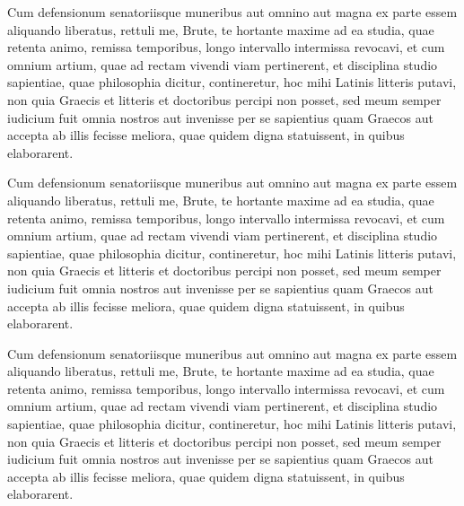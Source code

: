 \documentclass{article}
\begin{document}
\pstart%
Cum defensionum  senatoriisque muneribus aut omnino aut magna ex parte essem aliquando liberatus, rettuli me, Brute, te hortante maxime ad ea studia, quae retenta animo, remissa temporibus, longo intervallo intermissa revocavi, et cum omnium artium, quae ad rectam vivendi viam pertinerent,  et disciplina studio sapientiae, quae philosophia dicitur, contineretur, hoc mihi Latinis litteris  putavi, non quia  Graecis et litteris et doctoribus percipi non posset, sed meum semper iudicium fuit omnia nostros aut invenisse per se sapientius quam Graecos aut accepta ab illis fecisse meliora, quae quidem digna statuissent, in quibus elaborarent.
\pend

\pstart%
Cum defensionum  senatoriisque muneribus aut omnino aut magna ex parte essem aliquando liberatus, rettuli me, Brute, te hortante maxime ad ea studia, quae retenta animo, remissa temporibus, longo intervallo intermissa revocavi, et cum omnium artium, quae ad rectam vivendi viam pertinerent,  et disciplina studio sapientiae, quae philosophia dicitur, contineretur, hoc mihi Latinis litteris  putavi, non quia  Graecis et litteris et doctoribus percipi non posset, sed meum semper iudicium fuit omnia nostros aut invenisse per se sapientius quam Graecos aut accepta ab illis fecisse meliora, quae quidem digna statuissent, in quibus elaborarent.
\pend

\pstart%
Cum defensionum  senatoriisque muneribus aut omnino aut magna ex parte essem aliquando liberatus, rettuli me, Brute, te hortante maxime ad ea studia, quae retenta animo, remissa temporibus, longo intervallo intermissa revocavi, et cum omnium artium, quae ad rectam vivendi viam pertinerent,  et disciplina studio sapientiae, quae philosophia dicitur, contineretur, hoc mihi Latinis litteris  putavi, non quia  Graecis et litteris et doctoribus percipi non posset, sed meum semper iudicium fuit omnia nostros aut invenisse per se sapientius quam Graecos aut accepta ab illis fecisse meliora, quae quidem digna statuissent, in quibus elaborarent.
\pend

\endnumbering
\end{document}
